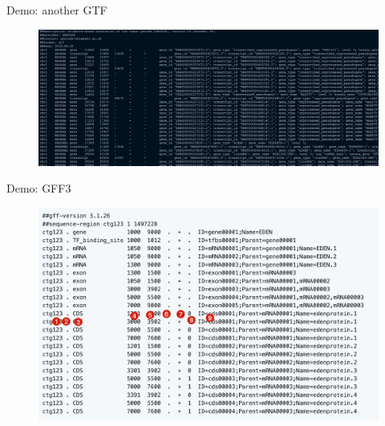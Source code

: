 \begin{frame}{Demo: another GTF}
    \begin{figure}
        \centering
        \includegraphics[width=\linewidth]{Images/gtf2.png}
    \end{figure}
\end{frame}

\begin{frame}{Demo: GFF3}
    \begin{figure}
        \centering
        \includegraphics[width=\linewidth]{Images/gff.jpg}
    \end{figure}
\end{frame}


